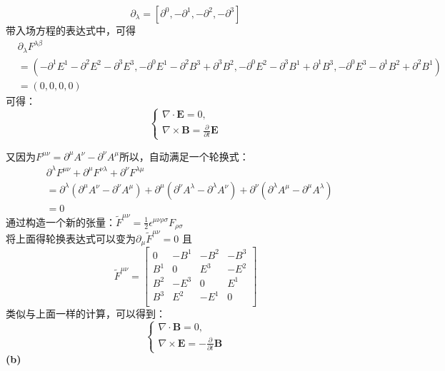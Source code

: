 \documentclass{article}
\begin{document}
$$
\partial_{\lambda} = \left[ \partial^{0}, -\partial^{1},-\partial^{2},-\partial^{3}\right]
$$
带入场方程的表达式中，可得
\begin{align}
&\partial_{\lambda} F^{\lambda \beta} \nonumber \\&= (-\partial^{1}E^{1}-\partial^{2}E^{2}-\partial^{3}E^{3},
	-\partial^{0}E^{1}-\partial^{2}B^{3}+\partial^{3}B^{2},
	-\partial^{0}E^{2}-\partial^{3}B^{1}+\partial^{1}B^{3},
	-\partial^{0}E^{3}-\partial^{1}B^{2}+\partial^{2}B^{1}) \nonumber \\ &=
	(0,0,0,0) \nonumber
\end{align}
可得：
\begin{equation*}
\left\{ \begin{aligned}
\nabla \cdot \mathbf{E} =0,\\
\nabla \times \mathbf{B} = \frac{\partial}{\partial t} \mathbf{E} 
\end{aligned}
\right.
\end{equation*}

又因为$F^{\mu \nu} = \partial^{\mu} A^{\nu} - \partial^{\nu} A^{\mu} $所以，自动满足一个轮换式：
\begin{align}
&\partial^{\lambda} F^{\mu \nu} + \partial^{\mu} F^{\nu \lambda} +\partial^{\nu} F^{\lambda \mu} \nonumber \\
&= \partial^{\lambda}(\partial^{\mu} A^{\nu} - \partial^{\nu} A^{\mu}) + \partial^{\mu}  (\partial^{\nu} A^{\lambda} - \partial^{\lambda} A^{\nu}) +\partial^{\nu}  (\partial^{\lambda} A^{\mu} - \partial^{\mu} A^{\lambda}) \nonumber \\
&=0 \nonumber 
\end{align}
通过构造一个新的张量：$\widetilde{F}^{\mu \nu} = \frac{1}{2} \epsilon^{\mu \nu \rho \sigma} F_{\rho \sigma} $\\
将上面得轮换表达式可以变为$\partial_{\mu} \widetilde{F}^{\mu \nu} =0$
且
$$
\widetilde{F}^{\mu \nu} = 
\left[ 
	\begin{matrix}
	0 & -B^1 & -B^2 & -B^3 \\
	B^1 & 0	& E^3 & -E^2 \\
	B^2 & -E^3 & 0 & E^1 \\
	B^3 & E^2 & -E^1 & 0 \\	
	\end{matrix}
\right]
$$
类似与上面一样的计算，可以得到：
\begin{equation*}
\left\{ \begin{aligned}
\nabla \cdot \mathbf{B} =0,\\
\nabla \times \mathbf{E} =- \frac{\partial}{\partial t} \mathbf{B} 
\end{aligned}
\right.
\end{equation*}
\bf{(b)}
\end{document}
